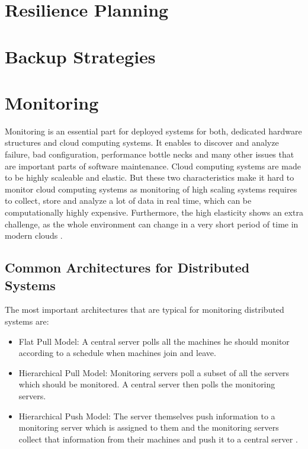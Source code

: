 \section{Resilience Planning}

\section{Backup Strategies}

\section{Monitoring}
Monitoring is an essential part for deployed systems for both,  dedicated hardware structures and cloud computing systems. It enables to discover and analyze failure, bad configuration, performance bottle necks and many other issues that are important parts of software maintenance. Cloud computing systems are made to be highly scaleable and elastic. But these two characteristics make it hard to monitor cloud computing systems as monitoring of high scaling systems requires to collect, store and analyze a lot of data in real time, which can be computationally highly expensive. Furthermore, the high elasticity shows an extra challenge, as the whole environment can change in a very short period of time in modern clouds \cite{Ward_2014}.

\subsection{Common Architectures for Distributed Systems}
\label{sec:common_arc_ds}
The most important architectures that are typical for monitoring distributed systems are:

\begin{itemize}
	\item Flat Pull Model: A central server polls all the machines he should monitor according to a schedule when machines join and leave.
	\item Hierarchical Pull Model: Monitoring servers poll a subset of all the servers which should be monitored. A central server then polls the monitoring servers.
	\item Hierarchical Push Model: The server themselves push information to a monitoring server which is assigned to them and the monitoring servers collect that information from their machines and push it to a central server \cite{Ward_2014}.
\end{itemize}

